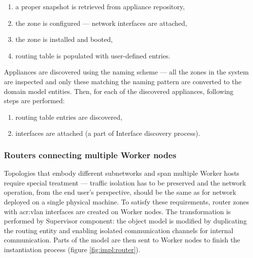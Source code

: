 \documentclass[11pt]{book}
\begin{document}
          \begin{enumerate}
            \item a proper snapshot is retrieved from appliance repository,
            \item the zone is configured --- network interfaces are attached,
            \item the zone is installed and booted,
            \item routing table is populated with user-defined entries.
          \end{enumerate}

          Appliances are discovered using the naming scheme --- all the zones in the system are inspected and only these
          matching the naming pattern are converted to the domain model entities. Then, for each of the discovered
          appliances, following steps are performed:

          \begin{enumerate}
            \item routing table entries are discovered,
            \item interfaces are attached (a part of Interface discovery process).
          \end{enumerate}


        \subsubsection{Routers connecting multiple Worker nodes}

          Topologies that embody different subnetworks and span multiple Worker hosts require special treatment ---
          traffic isolation has to be preserved and the network operation, from the end user's perspective, should be
          the same as for network deployed on a single physical machine. To satisfy these requirements, router zones
          with \gls{acr:vlan} interfaces are created on Worker nodes. The transformation is performed by Supervisor
          component: the object model is modified by duplicating the routing entity and enabling isolated communication
          channels for internal communication. Parts of the model are then sent to Worker nodes to finish the
          instantiation process (figure \ref{fig:impl:router}).
\end{document}
